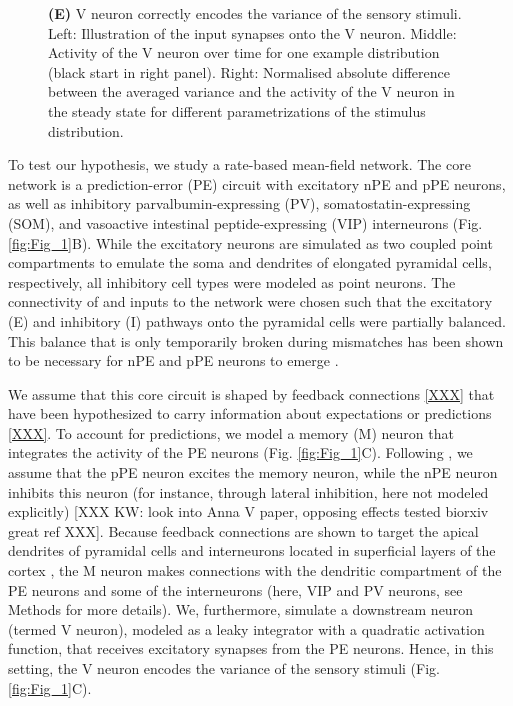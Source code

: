 \documentclass[10pt,a4paper,draft]{article}
\begin{document}
\begin{figure}[t!]
{{\bf (E)} V neuron correctly encodes the variance of the sensory stimuli. Left: Illustration of the input synapses onto the V neuron. Middle: Activity of the V neuron over time for one example distribution (black start in right panel). Right: Normalised absolute difference between the averaged variance and the activity of the V neuron in the steady state for different parametrizations of the stimulus distribution.
}
\label{fig:Fig_2}
\end{figure}
%

To test our hypothesis, we study a rate-based mean-field network. The core network is a prediction-error (PE) circuit with excitatory nPE and pPE neurons, as well as inhibitory parvalbumin-expressing (PV), somatostatin-expressing (SOM), and vasoactive intestinal peptide-expressing (VIP) interneurons (Fig. \ref{fig:Fig_1}B). While the excitatory neurons are simulated as two coupled point compartments to emulate the soma and dendrites of elongated pyramidal cells, respectively, all inhibitory cell types were modeled as point neurons. The connectivity of and inputs to the network were chosen such that the excitatory (E) and inhibitory (I) pathways onto the pyramidal cells were partially balanced. This balance that is only temporarily broken during mismatches has been shown to be necessary for nPE and pPE neurons to emerge \citep[][see Methods]{hertag2020learning, hertag2022prediction}. 

We assume that this core circuit is shaped by feedback connections \ref{XXX} that have been hypothesized to carry information about expectations or predictions \ref{XXX}. To account for predictions, we model a memory (M) neuron that integrates the activity of the PE neurons (Fig. \ref{fig:Fig_1}C). Following \cite{keller2018predictive}, we assume that the pPE neuron excites the memory neuron, while the nPE neuron inhibits this neuron (for instance, through lateral inhibition, here not modeled explicitly) [XXX KW: look into Anna V paper, opposing effects tested biorxiv great ref XXX]. Because feedback connections are shown to target the apical dendrites of pyramidal cells \citep{LarkumXXX} and interneurons located in superficial layers of the cortex \citep{XXX}, the M neuron makes connections with the dendritic compartment of the PE neurons and some of the interneurons (here, VIP and PV neurons, see Methods for more details). We, furthermore, simulate a downstream neuron (termed V neuron), modeled as a leaky integrator with a quadratic activation function, that receives excitatory synapses from the PE neurons. Hence, in this setting, the V neuron encodes the variance of the sensory stimuli (Fig. \ref{fig:Fig_1}C). 
\end{document}

